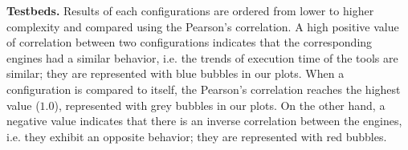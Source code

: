 \noindent \textbf{Testbeds.}
Results of each configurations are ordered from lower to higher complexity and compared using the Pearson's correlation. 
A high positive value of correlation between two configurations indicates that the corresponding engines had a similar behavior, i.e. the trends of execution time of the tools are similar; they are represented with blue bubbles in our plots. When a configuration is compared to itself, the Pearson's correlation reaches the highest value ($1.0$), represented with grey bubbles in our plots. 
On the other hand, a negative value indicates that there is an inverse correlation between the engines, i.e. they exhibit an opposite behavior; they are represented with red bubbles.
\begin{figure}[!tb]
    \centering
    \qquad
\end{figure}

